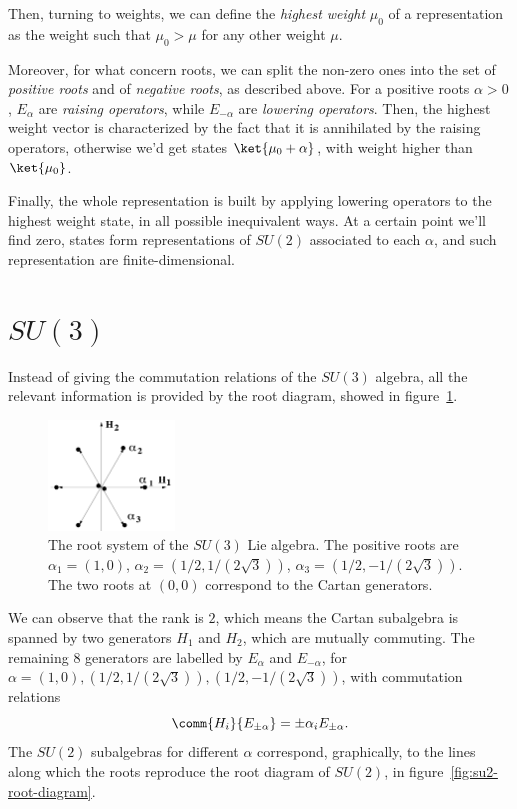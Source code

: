 Then, turning to weights, we can define the \emph{highest weight} $\mu_0$ of a representation as the weight such that $\mu_0 > \mu$ for any other weight $\mu$.

Moreover, for what concern roots, we can split the non-zero ones into the set of \emph{positive roots} and of \emph{negative roots}, as described above. For a positive roots $\alpha > 0$, $E_\alpha$ are \emph{raising operators}, while $E_{-\alpha}$ are \emph{lowering operators}. Then, the highest weight vector is characterized by the fact that it is annihilated by the raising operators, otherwise we'd get states $\ket{\mu_0 + \alpha}$, with weight higher than $\ket{\mu_0}$.

Finally, the whole representation is built by applying lowering operators to the highest weight state, in all possible inequivalent ways. At a certain point we'll find zero, states form representations of $SU(2)$ associated to each $\alpha$, and such representation are finite-dimensional.

\section{\texorpdfstring{$SU(3)$}{SU(3)}}
Instead of giving the commutation relations of the $SU(3)$ algebra, all the relevant information is provided by the root diagram, showed in figure~\ref{fig:su3-root-diagram}.

\begin{figure}
    \centering
    \includegraphics[width=0.3\textwidth]{figures/su3-root.png}
    \caption{The root system of the $SU(3)$ Lie algebra. The positive roots are $\alpha_1 = (1,0)$, $\alpha_2 = (1/2, 1/(2\sqrt{3}))$, $\alpha_3 = (1/2, -1/(2\sqrt{3}))$. The two roots at $(0,0)$ correspond to the Cartan generators.}
    \label{fig:su3-root-diagram}
\end{figure}

We can observe that the rank is $2$, which means the Cartan subalgebra is spanned by two generators $H_1$ and $H_2$, which are mutually commuting. The remaining $8$ generators are labelled by $E_\alpha$ and $E_{-\alpha}$, for $\alpha = (1,0), (1/2, 1/(2\sqrt{3})), (1/2, -1/(2\sqrt{3}))$, with commutation relations
\begin{equation}
    \comm{H_i}{E_{\pm \alpha}} = \pm \alpha_i E_{\pm \alpha} .
\end{equation}
The $SU(2)$ subalgebras for different $\alpha$ correspond, graphically, to the lines along which the roots reproduce the root diagram of $SU(2)$, in figure~\ref{fig:su2-root-diagram}.

